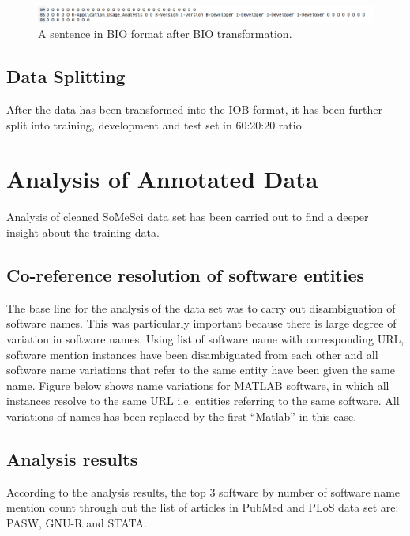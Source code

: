 \begin{figure}[htbp]
	\centering
	\includegraphics[width=1\textwidth]{4.graphics/figures/chap4/merging/BIo_2002515_plosmeth}
	\caption{A sentence in BIO format after BIO transformation.}
	\label{fig:chapter04:setup}
\end{figure}

\subsection{Data Splitting}
\label{subsec:dataset:preprocessing:Splitting}
After the data has been transformed into the IOB format, it has been further split into training, development and test set in 60:20:20 ratio.


\section{Analysis of Annotated Data}
\label{sec:dataset:Analysis}

Analysis of cleaned SoMeSci data set has been carried out to find a deeper insight about the training data. 

\subsection{Co-reference resolution of software entities }
\label{subsec:dataset:Analysis:resolution}

The base line for the analysis of the data set was to carry out disambiguation of software names. This was particularly important because there is large degree of variation in software names. Using list of software name with corresponding URL, software mention instances have been disambiguated from each other and all software name variations that refer to the same entity have been given the same name. Figure below shows name variations for MATLAB software, in which all instances resolve to the same URL i.e. entities referring to the same software. All variations of names has been replaced by the first “Matlab” in this case.


\subsection{Analysis results }
\label{subsec:dataset:Analysis:results}

According to the analysis results, the top 3 software by number of software name mention count through out the list of articles in PubMed and PLoS data set are: PASW, GNU-R and STATA.  

